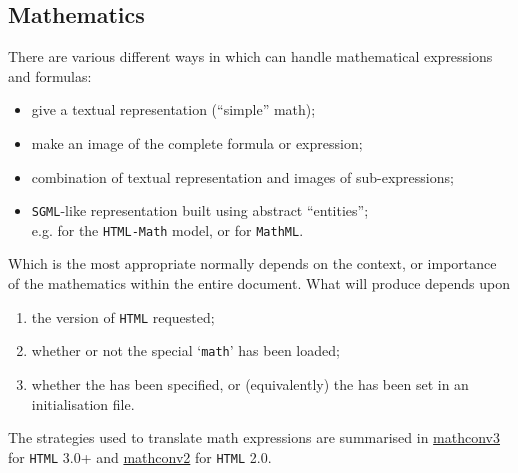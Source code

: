 \subsection{Mathematics\label{maths}}
%
There are various different ways in which \latextohtml{} can handle
mathematical expressions and formulas:
\begin{itemize}
\item
give a textual representation (``simple'' math);
\item
make an image of the complete formula or expression;
\item
combination of textual representation and images of
sub-expressions;
\item
\texttt{SGML}-like representation built using abstract ``entities'';\\
e.g. for the \texttt{HTML-Math} model, or for \texttt{MathML}.
%
\end{itemize}
Which is the most appropriate normally depends on the context,
or importance of the mathematics within the entire document.
What \latextohtml{} will produce depends upon
\begin{enumerate}
\item 
the version of \texttt{HTML} requested;
\item
whether or not the special `\texttt{math}'  has been loaded;
\item
whether the  
has been specified, or (equivalently) the  
 has been set in an initialisation file.
\end{enumerate}
%
The strategies used to translate math expressions are summarised
in \hyperref{the table below}{Table~}{}{mathconv3} for \texttt{HTML} 3.0+
and \hyperref{the subsequent table}{Table~}{}{mathconv2} for \texttt{HTML} 2.0.

